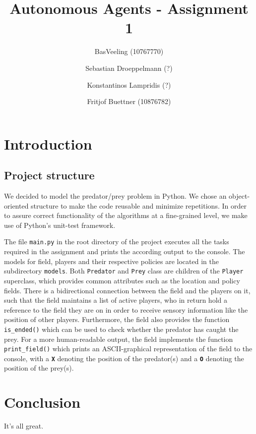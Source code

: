 \documentclass[11pt,a4paper]{article}
\begin{document}
\title{Autonomous Agents - Assignment 1}
\author{BasVeeling (10767770) \\ \and Sebastian Droeppelmann (?) \\ \and Konstantinos Lampridis (?) \\ \and Fritjof Buettner (10876782)}
\maketitle
\section{Introduction}
\subsection{Project structure}
We decided to model the predator/prey problem in Python. We chose an object-oriented structure to make the code reusable and minimize repetitions. In order to assure correct functionality of the algorithms at a fine-grained level, we make use of Python's unit-test framework.

The file \texttt{main.py} in the root directory of the project executes all the tasks required in the assignment and prints the according output to the console. The models for field, players and their respective policies are located in the subdirectory \texttt{models}. Both \texttt{Predator} and \texttt{Prey} class are children of the \texttt{Player} superclass, which provides common attributes such as the location and policy fields. 
There is a bidirectional connection between the field and the players on it, such that the field maintains a list of active players, who in return hold a reference to the field they are on in order to receive sensory information like the position of other players. 
Furthermore, the field also provides the function \texttt{is\_ended()} which can be used to check whether the predator has caught the prey. 
For a more human-readable output, the field implements the function \texttt{print\_field()} which prints an ASCII-graphical representation of the field to the console, with a \textbf{\texttt{X}} denoting the position of the predator(s) and a \textbf{\texttt{O}} denoting the position of the prey(s).

\section{Conclusion}
It's all great.
\end{document}
